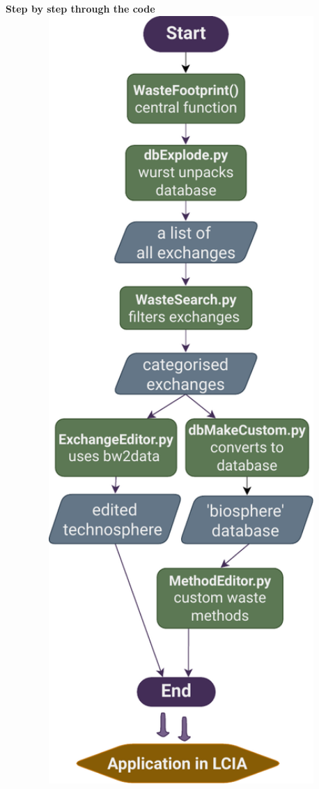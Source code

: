 \documentclass[a0paper,fleqn]{betterposter}
\begin{document}
{    }{
    \begin{center}
    {\selectfont \textbf{         Step by step through the code}}\\
    \vspace{30pt}    
    \includegraphics[width=1\textwidth]{img/Flowchart_WasteFootprint.pdf}\\

\end{center}}
\end{document}
